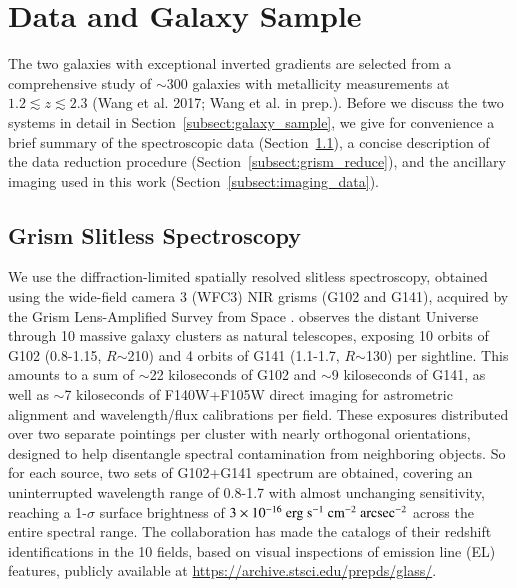 \section{Data and Galaxy Sample}\label{sect:data}

The two galaxies with exceptional inverted gradients are selected from a comprehensive study of $\sim$300 galaxies with 
metallicity measurements at $1.2\lesssim z\lesssim2.3$ (Wang et al. 2017; Wang et al. in prep.). Before we 
discuss the two systems in detail in Section~\ref{subsect:galaxy_sample}, we give for convenience a brief 
summary of the spectroscopic data (Section~\ref{subsect:grism_data}), a concise description of the data 
reduction procedure (Section~\ref{subsect:grism_reduce}), and the ancillary imaging used in this work 
(Section~\ref{subsect:imaging_data}).


\renewcommand{\thesubsection}{\thesection.\arabic{subsection}}
\subsection{\hst Grism Slitless Spectroscopy}\label{subsect:grism_data}

We use the diffraction-limited spatially resolved slitless spectroscopy, obtained using the \hst wide-field 
camera 3 (WFC3) NIR grisms (G102 and G141), acquired by the Grism Lens-Amplified Survey from Space
\citep[\glass,][]{2014ApJ...782L..36S,2015ApJ...812..114T}.
\glass observes the distant Universe through 10 massive galaxy clusters as natural telescopes, exposing 10 orbits of G102
(0.8-1.15\micron, $R$$\sim$210) and 4 orbits of G141 (1.1-1.7\micron, $R$$\sim$130) per sightline.
This amounts to a sum of $\sim$22 kiloseconds of G102 and $\sim$9 kiloseconds of G141, as well as $\sim$7 
kiloseconds of
F140W+F105W direct imaging for astrometric alignment and wavelength/flux calibrations per field.
These exposures distributed over two separate pointings per cluster with nearly orthogonal orientations,
designed to help disentangle spectral contamination from neighboring objects.
So for each source, two sets of G102+G141 spectrum are obtained, covering an uninterrupted wavelength range of 0.8-1.7\micron
with almost unchanging sensitivity, reaching a 1-$\sigma$ surface brightness of $3\times10^{-16}~\rm erg~s^{-1}~cm^{-2}~arcsec^{-2}$ across the entire
spectral range.
The \glass collaboration has made the catalogs of their redshift identifications in the 10 fields, based on visual inspections of
emission line (EL) features, publicly available at \url{https://archive.stsci.edu/prepds/glass/}.

